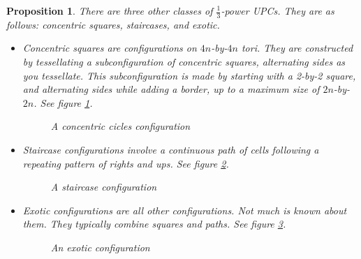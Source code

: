 \documentclass[12pt]{article}
\newtheorem{proposition}{Proposition}%
\theoremstyle{definition}
\theoremstyle{remark}
\theoremstyle{remark}
\begin{document}
\begin{proposition}
There are three other classes of $\frac{1}{3}$-power UPCs. They are as follows: concentric squares, \textit{staircases}, and exotic. \\
\begin{itemize}
  \item Concentric squares are configurations on $4n$-by-$4n$ tori. They are constructed by tessellating a subconfiguration of concentric squares, alternating sides as you tessellate. This subconfiguration is made by starting with a 2-by-2 square, and alternating sides while adding a border, up to a maximum size of $2n$-by-$2n$. See figure \ref{CCircles}.
  \begin{figure}
    \centering
    \caption{A concentric cicles configuration}
    \label{CCircles}
  \end{figure}
  \item Staircase configurations involve a continuous path of cells following a repeating pattern of \emph{rights} and \emph{ups}. See figure \ref{Staircase}.
  \begin{figure}
    \centering
    \caption{A staircase configuration}
    \label{Staircase}
  \end{figure}
  \item Exotic configurations are all other configurations. Not much is known about them. They typically combine squares and paths. See figure \ref{Exotic}.
  \begin{figure}
    \centering
    \caption{An exotic configuration}
    \label{Exotic}
  \end{figure}
\end{itemize}

\end{proposition}
\end{document}
